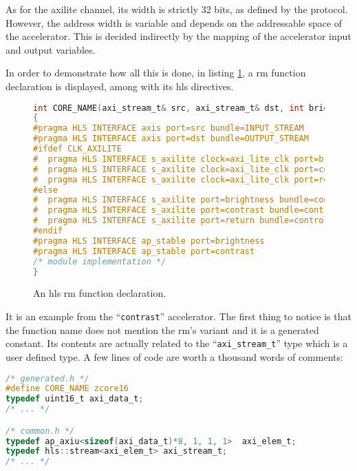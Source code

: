 As for the \gls{axilite} channel, its width is strictly 32 bits, as defined by the protocol.
However, the address width is variable and depends on the addressable space of the accelerator.
This is decided indirectly by the mapping of the accelerator input and output variables.

In order to demonstrate how all this is done, in listing \ref{lst:func-declaration},
a \gls{rm} function declaration is displayed, among with its \gls{hls} directives.

\begin{figure}[t!]
\centering
\begin{lstlisting}[style=basic,language=C]
int CORE_NAME(axi_stream_t& src, axi_stream_t& dst, int brightness, int contrast)
{
#pragma HLS INTERFACE axis port=src bundle=INPUT_STREAM
#pragma HLS INTERFACE axis port=dst bundle=OUTPUT_STREAM
#ifdef CLK_AXILITE
#  pragma HLS INTERFACE s_axilite clock=axi_lite_clk port=brightness bundle=control offset=0x10
#  pragma HLS INTERFACE s_axilite clock=axi_lite_clk port=contrast bundle=control offset=0x18
#  pragma HLS INTERFACE s_axilite clock=axi_lite_clk port=return bundle=control offset=0x38
#else
#  pragma HLS INTERFACE s_axilite port=brightness bundle=control offset=0x10
#  pragma HLS INTERFACE s_axilite port=contrast bundle=control offset=0x18
#  pragma HLS INTERFACE s_axilite port=return bundle=control offset=0x38
#endif
#pragma HLS INTERFACE ap_stable port=brightness
#pragma HLS INTERFACE ap_stable port=contrast
/* module implementation */
}
\end{lstlisting}
\caption{An \gls{hls} \gls{rm} function declaration.}
\label{lst:func-declaration}
\end{figure}

It is an example from the ``\texttt{contrast}'' accelerator. 
The first thing to notice is that the function name does not 
mention the \gls{rm}'s variant and it is a generated constant. 
Its contents are actually related to the ``\texttt{axi\_stream\_t}'' type 
which is a user defined type. A few lines of code are worth a thousand words of comments:

\begin{lstlisting}[style=basic,language=C]
/* generated.h */
#define CORE_NAME zcore16
typedef uint16_t axi_data_t;
/* ... */

/* common.h */
typedef ap_axiu<sizeof(axi_data_t)*8, 1, 1, 1>  axi_elem_t;
typedef hls::stream<axi_elem_t> axi_stream_t;
/* ... */
\end{lstlisting}

